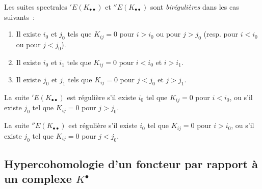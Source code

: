 \begin{env}[11.3.6]
\label{0.11.3.6-fr}
Les suites spectrales $'E(K_{\bullet\bullet})$ et
$''E(K_{\bullet\bullet})$ sont \emph{birégulières} dans les cas suivants~:
\begin{enumerate}
  \item[(a)] Il existe $i_0$ et $j_0$ tels que $K_{ij}=0$ pour $i>i_0$ ou
    pour $j>j_0$ (resp. pour $i<i_0$
    ou pour $j<j_0$).
  \item[(b)] Il existe $i_0$ et $i_1$ tels que $K_{ij}=0$ pour $i<i_0$ et
    $i>i_1$.
  \item[(c)] Il existe $j_0$ et $j_1$ tels que $K_{ij}=0$ pour $j<j_0$ et
    $j>j_1$.
\end{enumerate}

La suite $'E(K_{\bullet\bullet})$ est régulière s'il existe $i_0$ tel que
$K_{ij}=0$ pour $i<i_0$, ou s'il existe $j_0$ tel que $K_{ij}=0$ pour
$j>j_0$.

La suite $''E(K_{\bullet\bullet})$ est régulière s'il existe $i_0$ tel que
$K_{ij}=0$ pour $i>i_0$, ou s'il existe $j_0$ tel que $K_{ij}=0$ pour
$j<j_0$.
\end{env}

\subsection{Hypercohomologie d'un foncteur par rapport à un complexe
$K^\bullet$}
\label{subsection:0.11.4-fr}

